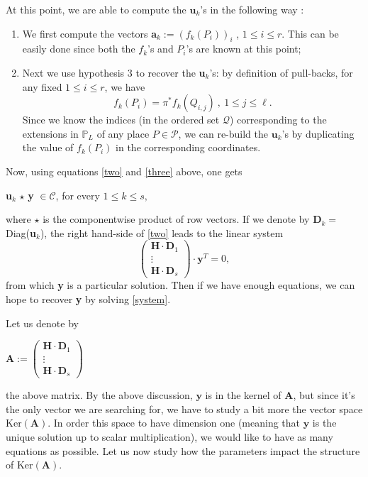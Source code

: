 \documentclass[10pt]{article}
\theoremstyle{definition}
\theoremstyle{definition}
\theoremstyle{definition}
\newcommand{\s}{\vspace{0.3cm}}
\newcommand{\cd}{\cdot}
\newcommand{\PP}{\mathbb{P}}
\newcommand{\PR}{\mathcal{P}}
\newcommand{\QR}{\mathcal{Q}}
\begin{document}
At this point, we are able to compute the $\mathbf{u}_{k}$'s in the following way :
\begin{enumerate}
\item We first compute the vectors \textbf{a}$_{k} := (f_k(P_i))_i$ , $1 \leq i \leq r$. This can be easily done since both the $f_k$'s and $P_i$'s are known at this point;
\item Next we use hypothesis $3$ to recover the \textbf{u}$_{k}$'s: by definition of pull-backs, for any fixed $1 \leq i \leq r$, we have 
\[f_k(P_i) = \pi^*f_k(Q_{i,j}) \ , \ 1 \leq j \leq \ell.\]
Since we know the indices (in the ordered set $\QR$) corresponding to the extensions in $\PP_L$ of any place $P \in \PR$, we can re-build the $\mathbf{u}_{k}$'s by duplicating the value of $f_k(P_i)$ in the corresponding coordinates.
\end{enumerate}

Now, using equations \eqref{two} and \eqref{three} above, one gets 
\begin{center}
\textbf{u}$_{k}$ $\star$ \textbf{y} $\in \mathcal{C}$, for every $1 \leq k \leq s,$ 
\end{center}
where $\star$ is the componentwise product of row vectors.
If we denote by \textbf{D}$_{k} = $ Diag(\textbf{u}$_{k}$), the right hand-side of \eqref{two} leads to the linear system 
\begin{equation} \label{system}
\begin{pmatrix}
\mathbf{H} \cd \textbf{D}_1 \\
\vdots \\
\mathbf{H} \cd \textbf{D}_s
\end{pmatrix}
\cd \textbf{y}^T = 0, 
\end{equation}
from which \textbf{y} is a particular solution.
Then if we have enough equations, we can hope to recover \textbf{y} by solving \eqref{system}. 

\s

 Let us denote by
\begin{center}
$\mathbf{A} := \begin{pmatrix}
\mathbf{H} \cd \mathbf{D}_1 \\
\vdots \\
\mathbf{H} \cd \mathbf{D}_s
\end{pmatrix}
$
\end{center}
the above matrix. By the above discussion, $\mathbf{y}$ is in the kernel of $\mathbf{A}$, but since it's the only vector we are searching for, we have to study a bit more the vector space $\mathrm{Ker}(\mathbf{A})$. In order this space to have dimension one (meaning that $\mathbf{y}$ is the unique solution up to scalar multiplication), we would like to have as many equations as possible. Let us now study how the parameters impact the structure of $\mathrm{Ker}(\mathbf{A})$.
\end{document}
